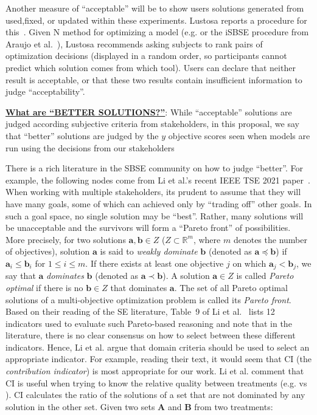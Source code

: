 Another measure of ``acceptable''
will be to show users solutions  generated from   used,fixed, or updated within these experiments. 
Lustosa reports a procedure for this~\cite{lustosa21}. Given N method for optimizing a model (e.g. {\ITTT} or the iSBSE procedure from   Araujo et al.~\cite{araujo2017architecture}), Lustosa recommends asking 
subjects to rank pairs of 
optimization decisions
(displayed in a random order,
so participants cannot predict which solution comes from which tool).  Users can declare
that neither result is acceptable, or that
 these two results contain insufficient information to judge ``acceptability''.
 
 
 \underline{\bf What are ``BETTER SOLUTIONS?''}:
While
 ``acceptable'' solutions
  are judged according subjective
criteria from   stakeholders,
in this proposal, we say that 
``better'' solutions   are judged   by the $y$ objective
scores seen when models are run using
the decisions from our stakeholders

There is a rich literature in the SBSE
community on how to judge  ``better''.
For example, the following nodes come
from  Li et al.'s recent
IEEE TSE 2021 paper~\cite{li20}. 
 When working with multiple stakeholders, its prudent to assume that they will
 have many goals, some of which can achieved only by ``trading off'' other goals.
In such a goal space, no single solution may be ``best''. Rather, many solutions will be unacceptable
and the survivors will form a ``Pareto front'' of possibilities. 
More precisely, 
for two solutions $\mathbf{a}, \mathbf{b} \in Z$
($Z \subset \mathbb{R}^m$, where $m$ denotes the number of objectives),
solution $\mathbf{a}$ is said to \textit{weakly dominate} $\mathbf{b}$
(denoted as $\mathbf{a}\preceq \mathbf{b}$)
if $\mathbf{a}_i \leq \mathbf{b}_i$ for $1 \leq i \leq m$.
If there exists at least one objective $j$ on which $\mathbf{a}_j < \mathbf{b}_j$,
we say that $\mathbf{a}$ \textit{dominates} $\mathbf{b}$ (denoted as $\mathbf{a}\prec \mathbf{b}$).
A solution $\mathbf{a} \in Z$ is called \textit{Pareto optimal}
if there is no $\mathbf{b} \in Z$ that dominates $\mathbf{a}$.
 The set of all Pareto optimal solutions of a multi-objective optimization problem is called its \textit{Pareto front}.
Based on their reading of the SE
literature, Table~9 of Li et al.~\cite{li20} lists 12   indicators used to evaluate such Pareto-based
reasoning and note that   in the literature, there is no clear consensus on how to select between these different indicators. Hence,
 Li et al. argue that domain criteria should be used to select
an appropriate indicator. 
For example,
reading their text, it would seem that 
  CI (the {\em contribution indicator}) is most appropriate for our work.
Li et al. comment that  CI is useful when trying to know the relative quality between treatments (e.g. {} vs {\ITTT}).
CI 
calculates the ratio of the solutions of a set that are not dominated by any solution in the other set. 
Given two sets $\mathbf{A}$ and $\mathbf{B}$ from two treatments:

